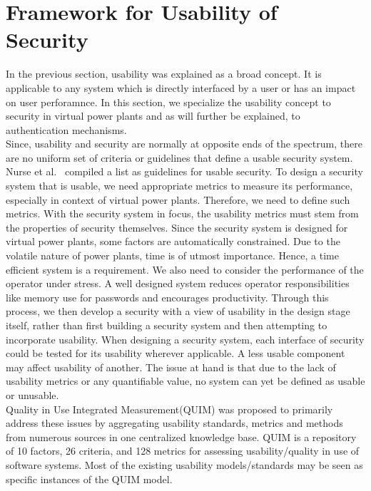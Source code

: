 \section{Framework for Usability of Security}
In the previous section, usability was explained as a broad concept. It is applicable to any system which is directly interfaced by a user or has an impact on user perforamnce. In this section, we specialize the usability concept to security in virtual power plants and as will further be explained, to authentication mechanisms.\\ Since, usability and security are normally at opposite ends of the spectrum, there are no uniform set of criteria or guidelines that define a usable security system. Nurse et al.~\cite{nurse2011guidelines} compiled a list as guidelines for usable security.
\newline
To design a security system that is usable, we need appropriate metrics to measure its performance, especially in context of virtual power plants. Therefore, we need to define such metrics. With the security system in focus, the usability metrics must stem from the properties of security themselves. Since the security system is designed for virtual power plants, some factors are automatically constrained. Due to the volatile nature of power plants, time is of utmost importance. Hence, a time efficient system is a requirement. We also need to consider the performance of the operator under stress. A well designed system reduces operator responsibilities like memory use for passwords and encourages productivity. Through this process, we then develop a security with a view of usability in the design stage itself, rather than first building a security system and then attempting to incorporate usability. When designing a security system, each interface of security could be tested for its usability wherever applicable. A less usable component may affect usability of another. The issue at hand is that due to the lack of usability metrics or any quantifiable value, no system can yet be defined as usable or unusable. \\


Quality in Use Integrated Measurement(QUIM)\cite{seffah2001quim} was proposed to primarily address these issues by aggregating usability standards, metrics and methods from numerous sources in one centralized knowledge base. QUIM is a repository of 10 factors, 26 criteria, and 128 metrics for assessing usability/quality in use of software systems. Most of the existing usability models/standards may be seen as specific instances of the QUIM model. \\

